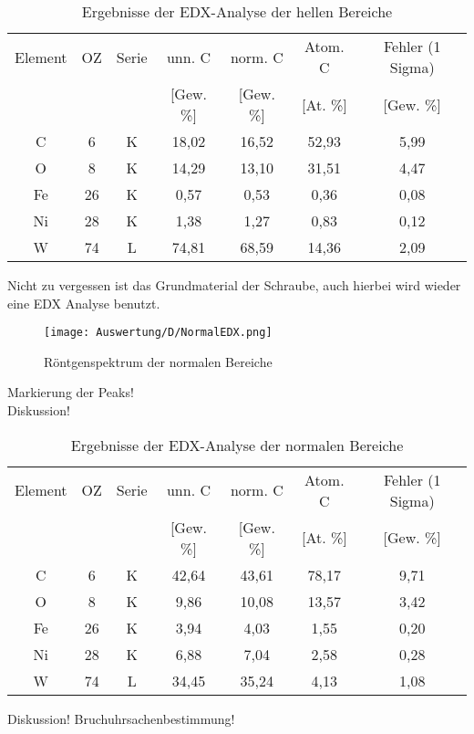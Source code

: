 \begin{table}[h]
    \centering
    \begin{tabular}{c|c|c|c|c|c|c}
        Element & OZ &Serie& unn. C & norm. C &  Atom. C  & Fehler (1 Sigma) \\
         & & & [Gew. \%] & [Gew. \%] & [At. \%] & [Gew. \%] \\
        \hline\hline
        C & 6 & K & 18,02 & 16,52 & 52,93 & 5,99\\
        O & 8 & K & 14,29 & 13,10 & 31,51 & 4,47\\
        Fe & 26 & K & 0,57 & 0,53 & 0,36 & 0,08\\
        Ni & 28 & K & 1,38 & 1,27 & 0,83 & 0,12\\
        W & 74 & L & 74,81 & 68,59 & 14,36 & 2,09
    \end{tabular}
    \caption{Ergebnisse der EDX-Analyse der hellen Bereiche}
\end{table}

\newpage
Nicht zu vergessen ist das Grundmaterial der Schraube, auch hierbei wird wieder eine EDX Analyse benutzt.
\begin{figure}[h]
    \centering
    \texttt{[image: Auswertung/D/NormalEDX.png]}
    \caption{Röntgenspektrum der normalen Bereiche}
\end{figure}

Markierung der Peaks!\\
Diskussion!\\

\begin{table}[h]
    \centering
    \begin{tabular}{c|c|c|c|c|c|c}
        Element & OZ &Serie& unn. C & norm. C &  Atom. C  & Fehler (1 Sigma) \\
         & & & [Gew. \%] & [Gew. \%] & [At. \%] & [Gew. \%] \\
        \hline\hline
        C & 6 & K & 42,64 & 43,61 & 78,17 & 9,71\\
        O & 8 & K & 9,86 & 10,08 & 13,57 & 3,42\\
        Fe & 26 & K & 3,94 & 4,03 & 1,55 & 0,20\\
        Ni & 28 & K & 6,88 & 7,04 & 2,58 & 0,28\\
        W & 74 & L & 34,45 & 35,24 & 4,13 & 1,08
    \end{tabular}
    \caption{Ergebnisse der EDX-Analyse der normalen Bereiche}
\end{table}

Diskussion! Bruchuhrsachenbestimmung!

